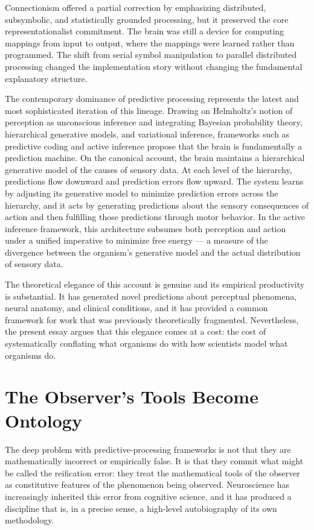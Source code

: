 \documentclass[12pt,a4paper]{report}
\theoremstyle{flyxion}
\begin{document}
Connectionism offered a partial correction by emphasizing distributed, subsymbolic, and statistically grounded processing, but it preserved the core representationalist commitment. The brain was still a device for computing mappings from input to output, where the mappings were learned rather than programmed. The shift from serial symbol manipulation to parallel distributed processing changed the implementation story without changing the fundamental explanatory structure.

The contemporary dominance of predictive processing represents the latest and most sophisticated iteration of this lineage. Drawing on Helmholtz's notion of perception as unconscious inference and integrating Bayesian probability theory, hierarchical generative models, and variational inference, frameworks such as predictive coding \cite{rao,clark} and active inference \cite{friston} propose that the brain is fundamentally a prediction machine. On the canonical account, the brain maintains a hierarchical generative model of the causes of sensory data. At each level of the hierarchy, predictions flow downward and prediction errors flow upward. The system learns by adjusting its generative model to minimize prediction errors across the hierarchy, and it acts by generating predictions about the sensory consequences of action and then fulfilling those predictions through motor behavior. In the active inference framework, this architecture subsumes both perception and action under a unified imperative to minimize free energy --- a measure of the divergence between the organism's generative model and the actual distribution of sensory data.

The theoretical elegance of this account is genuine and its empirical productivity is substantial. It has generated novel predictions about perceptual phenomena, neural anatomy, and clinical conditions, and it has provided a common framework for work that was previously theoretically fragmented. Nevertheless, the present essay argues that this elegance comes at a cost: the cost of systematically conflating what organisms do with how scientists model what organisms do.

\section{The Observer's Tools Become Ontology}

The deep problem with predictive-processing frameworks is not that they are mathematically incorrect or empirically false. It is that they commit what might be called the reification error: they treat the mathematical tools of the observer as constitutive features of the phenomenon being observed. Neuroscience has increasingly inherited this error from cognitive science, and it has produced a discipline that is, in a precise sense, a high-level autobiography of its own methodology.
\end{document}
